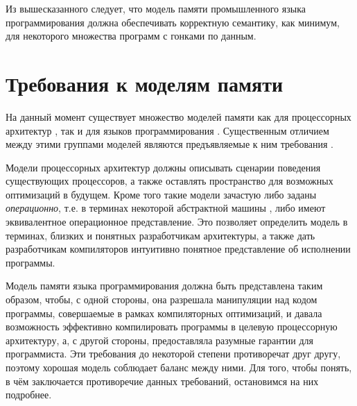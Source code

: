 Из вышесказанного следует, что модель памяти промышленного языка программирования должна обеспечивать корректную семантику,
как минимум, для некоторого множества программ с гонками по данным.

\section{Требования к моделям памяти}
На данный момент существует множество моделей памяти как для процессорных архитектур
\cite{Sewell-al:CACM10,Alglave-al:TOPLAS14,Flur-al:POPL16,Pulte-al:POPL18,Sarkar-al:PLDI11,Kavanagh-Brookes:CoRR17},
так и для языков программирования
\cite{Crary-Sullivan:POPL15,Lamport:TC79,Boudol-al:EXPRESS12,Boudol-Petri:POPL09,PichonPharabod-Sewell:POPL16,Jeffrey-Riely:LICS16,
Nienhuis-al:OOPSLA16,Batty-al:POPL11,Manson-al:POPL05}.
Существенным отличием между этими группами моделей являются предъявляемые к ним требования .

Модели процессорных архитектур должны описывать сценарии поведения существующих процессоров, а также оставлять пространство
для возможных оптимизаций в будущем.
Кроме того такие модели зачастую либо заданы \emph{операционно}, т.е. в терминах некоторой
абстрактной машины \cite{Diehl-al:FGCS00}, либо имеют эквивалентное операционное представление.
Это позволяет определить модель в терминах, близких и понятных разработчикам архитектуры,
а также дать разработчикам компиляторов интуитивно понятное представление
об исполнении программы.

Модель памяти языка программирования должна быть представлена таким образом, чтобы, с одной стороны,
она разрешала манипуляции над кодом программы, совершаемые в рамках компиляторных оптимизаций, и давала возможность
эффективно компилировать программы в целевую процессорную архитектуру, а, с другой стороны, предоставляла
разумные гарантии для программиста.
Эти требования до некоторой степени противоречат друг другу, поэтому хорошая модель
соблюдает баланс между ними.
Для того, чтобы понять, в чём заключается противоречие данных требований, остановимся на них подробнее.

